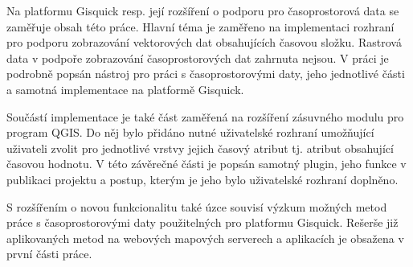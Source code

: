\bigskip
Na platformu Gisquick resp. její rozšíření o podporu pro
časoprostorová data se zaměřuje obsah této práce. Hlavní téma je
zaměřeno na implementaci rozhraní pro podporu zobrazování vektorových
dat obsahujících časovou složku. Rastrová data v podpoře zobrazování časoprostorových dat zahrnuta nejsou. V práci je podrobně popsán nástroj
pro práci s časoprostorovými daty, jeho jednotlivé části a samotná
implementace na platformě Gisquick.

Součástí implementace je také část zaměřená na rozšíření zásuvného
modulu pro program QGIS. Do něj bylo přidáno nutné uživatelské
rozhraní umožňující uživateli zvolit pro jednotlivé vrstvy jejich
časový atribut tj. atribut obsahující časovou hodnotu. V této
závěrečné části je popsán samotný plugin, jeho funkce v publikaci
projektu a postup, kterým je jeho bylo uživatelské rozhraní doplněno.

S rozšířením o novou funkcionalitu také úzce souvisí výzkum možných metod práce s
časoprostorovými daty použitelných pro platformu Gisquick. Rešerše již
aplikovaných metod na webových mapových serverech a aplikacích je
obsažena v první části práce.